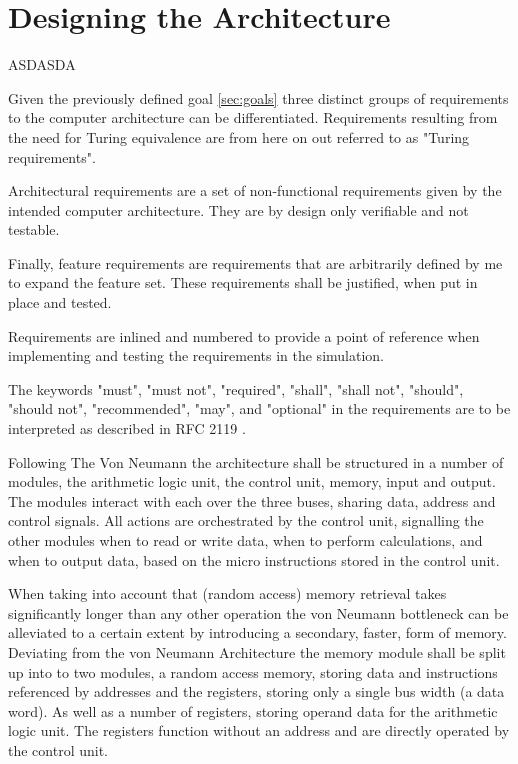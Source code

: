 \chapter{Designing the Architecture} \label{chap:arch}

ASDASDA

Given the previously defined goal \ref{sec:goals} three distinct groups of requirements to the computer architecture can be differentiated. Requirements resulting from the need for Turing equivalence are from here on out referred to as "Turing requirements".

Architectural requirements are a set of non-functional requirements given by the intended computer architecture. They are by design only verifiable and not testable.

Finally, feature requirements are requirements that are arbitrarily defined by me to expand the feature set. These requirements shall be justified, when put in place and tested.

Requirements are inlined and numbered to provide a point of reference when implementing and testing the requirements in the simulation. 

\newtheorem{turing-requirement}{Turing Req.}[section]
\newtheorem{arch-requirement}{Arch. Req.}[section]
\newtheorem{feat-requirement}{Feat. Req.}[section]

The keywords "must", "must not", "required", "shall", "shall not", "should", "should not", "recommended",  "may", and "optional" in the requirements are to be interpreted as described in RFC 2119 \cite{rfc2119}.



Following The Von Neumann the architecture shall be structured in a number of modules, the arithmetic logic unit, the control unit, memory, input and output. The modules interact with each over the three buses, sharing data, address and control signals. All actions are orchestrated by the control unit, signalling the other modules when to read or write data, when to perform calculations, and when to output data, based on the micro instructions stored in the control unit.

When taking into account that (random access) memory retrieval takes significantly longer than any other operation the von Neumann bottleneck can be alleviated to a certain extent by introducing a secondary, faster, form of memory. Deviating from the von Neumann Architecture the memory module shall be split up into to two modules, a random access memory, storing data and instructions referenced by addresses and the registers, storing only a single bus width (a data word). As well as a number of registers, storing operand data for the arithmetic logic unit. The registers function without an address and are directly operated by the control unit.

